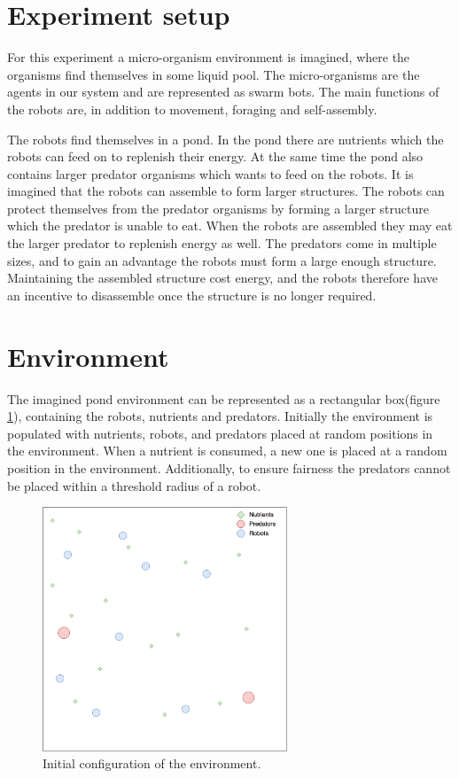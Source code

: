 \section{Experiment setup}
\label{sec:description}
For this experiment a micro-organism environment is imagined, where the organisms find themselves in some liquid pool. 
The micro-organisms are the agents in our system and are represented as swarm bots.
The main functions of the robots are, in addition to movement, foraging and self-assembly.

The robots find themselves in a pond.
In the pond there are nutrients which the robots can feed on to replenish their energy.
At the same time the pond also contains larger predator organisms which wants to feed on the robots.
It is imagined that the robots can assemble to form larger structures.
The robots can protect themselves from the predator organisms by forming a larger structure which the predator is unable to eat.
When the robots are assembled they may eat the larger predator to replenish energy as well.
The predators come in multiple sizes, and to gain an advantage the robots must form a large enough structure.
Maintaining the assembled structure cost energy, and the robots therefore have an incentive to disassemble once the structure is no longer required.

\section{Environment}
The imagined pond environment can be represented as a rectangular box(figure \ref{fig:environment}), containing the robots, nutrients and predators.
Initially the environment is populated with nutrients, robots, and predators placed at random positions in the environment.
When a nutrient is consumed, a new one is placed at a random position in the environment.
Additionally, to ensure fairness the predators cannot be placed within a threshold radius of a robot. 

\begin{figure}[H]
	
	\centering
	\includegraphics[width=0.65\textwidth]{chapters/res/Environment.png}
	\caption{Initial configuration of the environment.}
	\label{fig:environment}
\end{figure}

